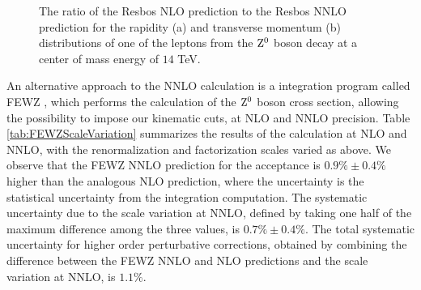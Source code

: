 \documentclass{cmspaper}
\begin{document}
\begin{figure}[htb]
  \begin{center}
    \caption{The ratio of the Resbos NLO prediction to the Resbos NNLO prediction for the rapidity (a) and transverse momentum (b) distributions of one of the leptons from the $\mathrm{Z^0}$ boson decay at a center of mass energy of $14$ TeV.}
    \label{fig:ResbosNNLO_LeptonRapidityPt}
  \end{center}
\end{figure}

An alternative approach to the NNLO calculation is a integration program called FEWZ \cite{FEWZ}, which performs the calculation of the $\mathrm{Z^0}$ boson cross section, allowing the possibility to impose our kinematic cuts, at NLO and NNLO precision. Table \ref{tab:FEWZScaleVariation} summarizes the results of the calculation at NLO and NNLO, with the renormalization and factorization scales varied as above. We observe that the FEWZ NNLO prediction for the acceptance is $0.9\% \pm 0.4\%$ higher than the analogous NLO prediction, where the uncertainty is the statistical uncertainty from the integration computation.  The systematic uncertainty due to the scale variation at NNLO, defined by taking one half of the maximum difference among the three values, is $ 0.7\% \pm 0.4\%$. The total systematic uncertainty for higher order perturbative corrections, obtained by combining the difference between the FEWZ NNLO and NLO predictions and the scale variation at NNLO, is $1.1\%$. 
\end{document}
